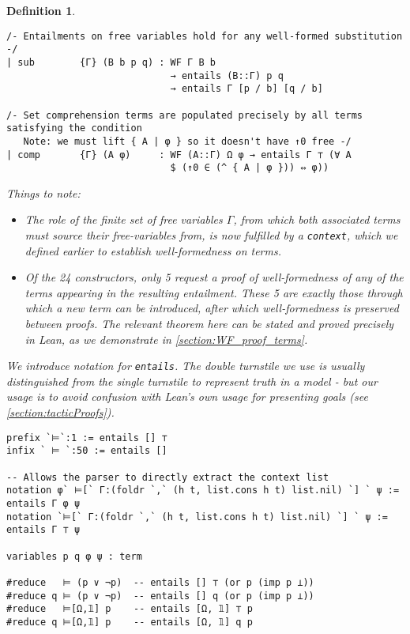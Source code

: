\documentclass[12pt,leqno]{article}
\def\lc{\lstinline}
\theoremstyle{example}
\newtheorem{definition}[theorem]{Definition}
\numberwithin{equation}{section}
\begin{document}
\begin{definition}
\begin{lstlisting}[basicstyle=\small\ttfamily, frame=single]
/- Entailments on free variables hold for any well-formed substitution -/
| sub        {Γ} (B b p q) : WF Γ B b
                             → entails (B::Γ) p q
                             → entails Γ [p / b] [q / b]

/- Set comprehension terms are populated precisely by all terms satisfying the condition   
   Note: we must lift { A | φ } so it doesn't have ↑0 free -/
| comp       {Γ} (A φ)     : WF (A::Γ) Ω φ → entails Γ ⊤ (∀ A
                             $ (↑0 ∈ (^ { A | φ })) ⇔ φ))
\end{lstlisting}

Things to note:
\begin{itemize}
  \item The role of the finite set of free variables $\Gamma$, from which both associated terms must source their free-variables from, is now fulfilled by a \lc{context}, which we defined earlier to establish well-formedness on terms.
  \item Of the 24 constructors, only 5 request a proof of well-formedness of any of the terms appearing in the resulting entailment. These 5 are exactly those through which a new term can be introduced, after which well-formedness is preserved between proofs. The relevant theorem here can be stated and proved precisely in Lean, as we demonstrate in \ref{section:WF_proof_terms}.
\end{itemize}

We introduce notation for \lc{entails}. The double turnstile we use is usually distinguished from the single turnstile to represent truth in a model - but our usage is to avoid confusion with Lean's own usage for presenting goals (see \ref{section:tacticProofs}).

\begin{lstlisting}
prefix `⊨`:1 := entails [] ⊤
infix ` ⊨ `:50 := entails []

-- Allows the parser to directly extract the context list
notation φ` ⊨[` Γ:(foldr `,` (h t, list.cons h t) list.nil) `] ` ψ := entails Γ φ ψ
notation `⊨[` Γ:(foldr `,` (h t, list.cons h t) list.nil) `] ` ψ := entails Γ ⊤ ψ

variables p q φ ψ : term

#reduce   ⊨ (p ∨ ¬p)  -- entails [] ⊤ (or p (imp p ⊥))
#reduce q ⊨ (p ∨ ¬p)  -- entails [] q (or p (imp p ⊥))
#reduce   ⊨[Ω,𝟙] p    -- entails [Ω, 𝟙] ⊤ p
#reduce q ⊨[Ω,𝟙] p    -- entails [Ω, 𝟙] q p
\end{lstlisting}
\end{definition}
\end{document}
